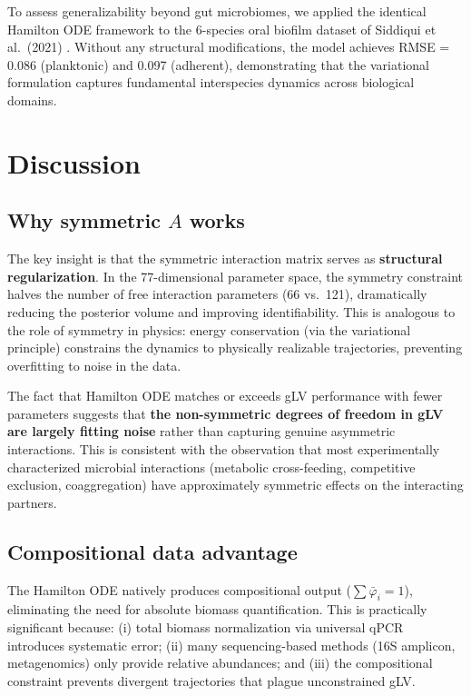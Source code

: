 \documentclass[10pt,a4paper]{article}
\begin{document}
To assess generalizability beyond gut microbiomes, we applied the identical
Hamilton ODE framework to the 6-species oral biofilm dataset of Siddiqui
et al.\ (2021) \cite{siddiqui2021}. Without any structural modifications,
the model achieves RMSE = 0.086 (planktonic) and 0.097 (adherent),
demonstrating that the variational formulation captures fundamental
interspecies dynamics across biological domains.

\section{Discussion}

\subsection{Why symmetric $A$ works}

The key insight is that the symmetric interaction matrix serves as
\textbf{structural regularization}. In the 77-dimensional parameter space,
the symmetry constraint halves the number of free interaction parameters
(66 vs.\ 121), dramatically reducing the posterior volume and improving
identifiability. This is analogous to the role of symmetry in physics:
energy conservation (via the variational principle) constrains the
dynamics to physically realizable trajectories, preventing overfitting
to noise in the data.

The fact that Hamilton ODE matches or exceeds gLV performance with fewer
parameters suggests that \textbf{the non-symmetric degrees of freedom in
gLV are largely fitting noise} rather than capturing genuine asymmetric
interactions. This is consistent with the observation that most
experimentally characterized microbial interactions (metabolic cross-feeding,
competitive exclusion, coaggregation) have approximately symmetric effects
on the interacting partners.

\subsection{Compositional data advantage}

The Hamilton ODE natively produces compositional output
($\sum \bar{\varphi}_i = 1$), eliminating the need for absolute biomass
quantification. This is practically significant because:
(i) total biomass normalization via universal qPCR introduces systematic
error; (ii) many sequencing-based methods (16S amplicon, metagenomics)
only provide relative abundances; and (iii) the compositional constraint
prevents divergent trajectories that plague unconstrained gLV.
\end{document}

